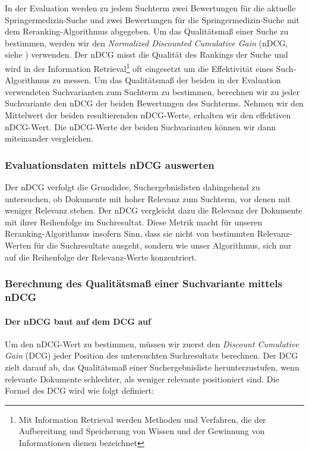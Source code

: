 In der Evaluation werden zu jedem Suchterm zwei Bewertungen für die aktuelle Springermedizin-Suche und zwei Bewertungen für die Springermedizin-Suche mit dem Reranking-Algorithmus abgegeben. Um das Qualitätsmaß einer Suche zu bestimmen, werden wir den \textit{Normalized Discounted Cumulative Gain} (nDCG, siehe \cite{nDCG}) verwenden. Der nDCG misst die Qualität des Rankings der Suche und wird in der Information Retrieval\footnote{Mit Information Retrieval werden Methoden und Verfahren, die der Aufbereitung und Speicherung von Wissen und der Gewinnung von Informationen dienen bezeichnet} oft eingesetzt um die Effektivität eines Such-Algorithmus zu messen.  Um das Qualitätsmaß der beiden in der Evaluation verwendeten Suchvarianten zum Suchterm zu bestimmen, berechnen wir zu jeder Suchvariante den nDCG der beiden Bewertungen des Suchterms. Nehmen wir den Mittelwert der beiden resultierenden nDCG-Werte, erhalten wir den effektiven nDCG-Wert. Die nDCG-Werte der beiden Suchvarianten können wir dann miteinander vergleichen.

\subsubsection{Evaluationsdaten mittels nDCG auswerten}
\label{sec:Evaluation:Aufbau:Metrik:EvaluationsdatennDCG}

Der nDCG verfolgt die Grundidee, Suchergebnislisten dahingehend zu untersuchen, ob Dokumente mit hoher Relevanz zum Suchterm, vor denen mit weniger Relevanz stehen. Der nDCG vergleicht dazu die Relevanz der Dokumente mit ihrer Reihenfolge im Suchresultat. Diese Metrik macht für unseren Reranking-Algorithmus insofern Sinn, dass sie nicht von bestimmten Relevanz-Werten für die Suchresultate ausgeht, sondern wie unser Algorithmus, sich nur auf die Reihenfolge der Relevanz-Werte konzentriert. 

\subsubsection{Berechnung des Qualitätsmaß einer Suchvariante mittels nDCG}
\label{sec:Evaluation:Aufbau:Metrik:BerechnungnDCG}

\paragraph{Der nDCG baut auf dem DCG auf} Um den nDCG-Wert zu bestimmen, müssen wir zuerst den \textit{Discount Cumulative Gain} (DCG) jeder Position des untersuchten Suchresultats berechnen. Der DCG zielt darauf ab, das Qualitätsmaß einer Suchergebnisliste herunterzustufen, wenn relevante Dokumente schlechter, als weniger relevante positioniert sind. Die Formel des DCG wird wie folgt definiert:

